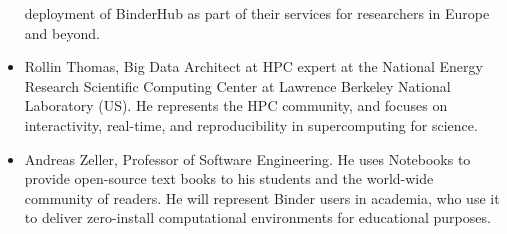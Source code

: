 \begin{itemize}
  deployment of BinderHub as part of their services for researchers in Europe
  and beyond.
\item Rollin Thomas, Big Data Architect at HPC expert at the National Energy
  Research Scientific Computing Center at Lawrence Berkeley National Laboratory
  (US). He represents the HPC community, and focuses on interactivity,
  real-time, and reproducibility in supercomputing for science.
\item Andreas Zeller, Professor of Software Engineering. He uses Notebooks 
  to provide open-source text books to his students and the world-wide
  community of readers. He will represent Binder users in academia, who use it 
  to deliver zero-install computational environments for educational
  purposes.
\end{itemize}
